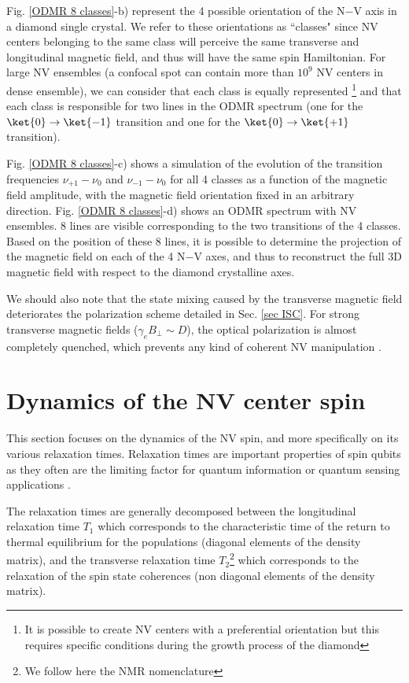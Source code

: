 \documentclass[a4paper, 11pt]{book}
\begin{document}
Fig. \ref{ODMR 8 classes}-b) represent the 4 possible orientation of the N$-$V axis in a diamond single crystal. We refer to these orientations as ``classes" since NV centers belonging to the same class will perceive the same transverse and longitudinal magnetic field, and thus will have the same spin Hamiltonian. For large NV ensembles (a confocal spot can contain more than $10^9$ NV centers in dense ensemble), we can consider that each class is equally represented \footnote{It is possible to create NV centers with a preferential orientation \citep{lesik2014perfect} but this requires specific conditions during the growth process of the diamond} and that each class is responsible for two lines in the ODMR spectrum (one for the $\ket{0} \to \ket{-1}$ transition and one for the $\ket{0} \to \ket{+1}$ transition). 

Fig. \ref{ODMR 8 classes}-c) shows a simulation of the evolution of the transition frequencies $\nu_{+1} - \nu_{0}$ and $\nu_{-1} - \nu_{0}$ for all 4 classes as a function of the magnetic field amplitude, with the magnetic field orientation fixed in an arbitrary direction. Fig. \ref{ODMR 8 classes}-d) shows an ODMR spectrum with NV ensembles. 8 lines are visible corresponding to the two transitions of the 4 classes. Based on the position of these 8 lines, it is possible to determine the projection of the magnetic field on each of the 4 N$-$V axes, and thus to reconstruct the full 3D magnetic field with respect to the diamond crystalline axes.

We should also note that the state mixing caused by the transverse magnetic field deteriorates the polarization scheme detailed in Sec. \ref{sec ISC}. For strong transverse magnetic fields ($\gamma_e B_\perp \sim D$), the optical polarization is almost completely quenched, which prevents any kind of coherent NV manipulation \citep{tetienne2012magnetic}.

\section{Dynamics of the NV center spin}

This section focuses on the dynamics of the NV spin, and more specifically on its various relaxation times. Relaxation times are important properties of spin qubits as they often are the limiting factor for quantum information or quantum sensing applications \citep{de2021materials, degen2017quantum}.

The relaxation times are generally decomposed between the longitudinal relaxation time $T_1$ which corresponds to the characteristic time of the return to thermal equilibrium for the populations (diagonal elements of the density matrix), and the transverse relaxation time $T_2$\footnote{We follow here the NMR nomenclature} which corresponds to the relaxation of the spin state coherences (non diagonal elements of the density matrix).
\end{document}
